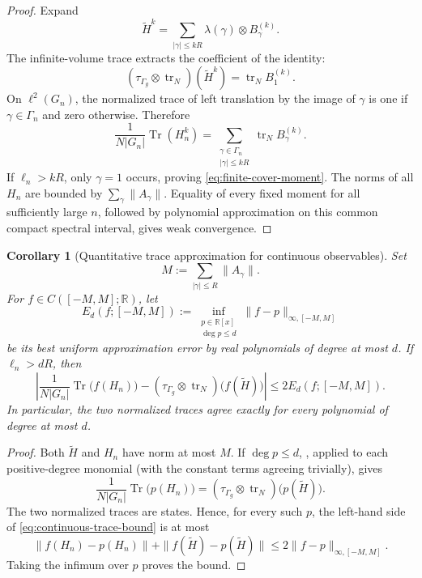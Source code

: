 \documentclass[11pt]{article}
\newtheorem{corollary}[theorem]{Corollary}
\theoremstyle{definition}
\theoremstyle{remark}
\newcommand{\RR}{\mathbb R}
\newcommand{\Tr}{\operatorname{Tr}}
\newcommand{\tr}{\operatorname{tr}}
\begin{document}
\begin{proof}
Expand
\[
        \widetilde H^k
           =\sum_{|\gamma|\leq kR}
               \lambda(\gamma)\otimes B_\gamma^{(k)}.
\]
The infinite-volume trace extracts the coefficient of the identity:
\[
  (\tau_{\Gamma_g}\otimes\tr_N)(\widetilde H^k)
       =\tr_N B_1^{(k)}.
\]
On \(\ell^2(G_n)\), the normalized trace of left translation by the image of
\(\gamma\) is one if \(\gamma\in\Gamma_n\) and zero otherwise.  Therefore
\[
 \frac{1}{N|G_n|}\Tr(H_n^k)
     =\sum_{\substack{\gamma\in\Gamma_n\\|\gamma|\leq kR}}
        \tr_N B_\gamma^{(k)}.
\]
If \(\ell_n>kR\), only \(\gamma=1\) occurs, proving
\eqref{eq:finite-cover-moment}.  The norms of all \(H_n\) are bounded by
\(\sum_\gamma\|A_\gamma\|\).  Equality of every fixed moment for all
sufficiently large \(n\), followed by polynomial approximation on this
common compact spectral interval, gives weak convergence.
\end{proof}

\begin{corollary}[Quantitative trace approximation for continuous observables]
\label{cor:finite-cover-functional-calculus}
Set
\[
                 M:=\sum_{|\gamma|\leq R}\|A_\gamma\|.
\]
For \(f\in C([-M,M];\RR)\), let
\[
 E_d(f;[-M,M])
   :=\inf_{\substack{p\in\RR[x]\\ \deg p\leq d}}
          \|f-p\|_{\infty,[-M,M]}
 \tag{10.5a}\label{eq:best-polynomial-approximation}
\]
be its best uniform approximation error by real polynomials of degree at
most \(d\).  If \(\ell_n>dR\), then
\[
\left|
 \frac{1}{N|G_n|}\Tr\!\bigl(f(H_n)\bigr)
 -
 (\tau_{\Gamma_g}\otimes\tr_N)
      \bigl(f(\widetilde H)\bigr)
\right|
 \leq 2E_d(f;[-M,M]).
\tag{10.5b}\label{eq:continuous-trace-bound}
\]
In particular, the two normalized traces agree exactly for every polynomial
of degree at most \(d\).
\end{corollary}

\begin{proof}
Both \(\widetilde H\) and \(H_n\) have norm at most \(M\).  If
\(\deg p\leq d\), , applied to each
positive-degree monomial (with the constant terms agreeing trivially), gives
\[
 \frac{1}{N|G_n|}\Tr\!\bigl(p(H_n)\bigr)
 =
 (\tau_{\Gamma_g}\otimes\tr_N)
      \bigl(p(\widetilde H)\bigr).
\]
The two normalized traces are states.  Hence, for every such \(p\),
the left-hand side of \eqref{eq:continuous-trace-bound} is at most
\[
 \|f(H_n)-p(H_n)\|
 +\|f(\widetilde H)-p(\widetilde H)\|
 \leq 2\|f-p\|_{\infty,[-M,M]}.
\]
Taking the infimum over \(p\) proves the bound.
\end{proof}
\end{document}
